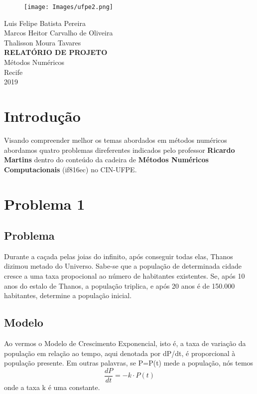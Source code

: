 \documentclass[12pt]{article}
\begin{document}
\begin{titlepage}
\begin{figure}[t]
\centering
\texttt{[image: Images/ufpe2.png]}
\label{fig_ufpe}
\end{figure}
\begin{center} 
{\large Luis Felipe Batista Pereira}\\[0.2cm]
{\large Marcos Heitor Carvalho de Oliveira}\\[0.2cm]
{\large Thalisson Moura Tavares}\\[5.5cm]
{\bf \Large RELATÓRIO DE PROJETO}\\[0.2cm]
{\large Métodos Numéricos}\\[5.5cm]
{\large Recife}\\[0.1cm]
{\large 2019}
\end{center}
\end{titlepage}

\tableofcontents
\newpage

\section{Introdução}
Visando compreender melhor os temas abordados em métodos numéricos abordamos quatro problemas direferentes indicados pelo professor \textbf{Ricardo Martins} dentro do conteúdo da cadeira de \textbf{Métodos Numéricos Computacionais} (if816ec) no CIN-UFPE.  




\section{Problema 1}

\subsection{Problema}
Durante a caçada pelas joias do infinito, após conseguir todas elas, Thanos dizimou metado do Universo. Sabe-se que a população de determinada cidade cresce a uma taxa propocional ao número de habitantes existentes. Se, após 10 anos do estalo de Thanos, a população triplica, e após 20 anos é de 150.000 habitantes, determine a população inicial.

\subsection{Modelo}
Ao vermos o Modelo de Crescimento Exponencial, isto é, a taxa de variação da população em relação ao tempo, aqui denotada por dP/dt, é proporcional à população presente. Em outras palavras, se P=P(t) mede a população, nós temos
\begin{equation}
    \frac{dP}{dt} = -k \cdot P(t)
\label{eq_1}
\end{equation}
onde a taxa k é uma constante.
\end{document}

